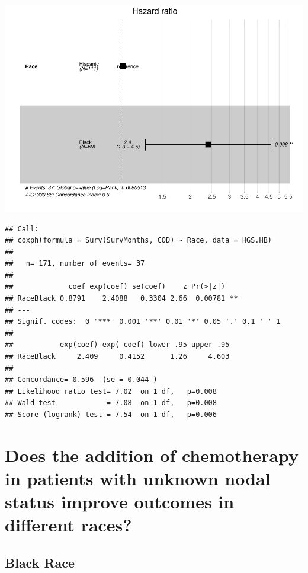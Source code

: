 \documentclass[
]{article}
\begin{document}
\includegraphics{EarlyOvaryRace_files/figure-latex/unnamed-chunk-7-1.pdf}

\begin{verbatim}
## Call:
## coxph(formula = Surv(SurvMonths, COD) ~ Race, data = HGS.HB)
## 
##   n= 171, number of events= 37 
## 
##             coef exp(coef) se(coef)    z Pr(>|z|)   
## RaceBlack 0.8791    2.4088   0.3304 2.66  0.00781 **
## ---
## Signif. codes:  0 '***' 0.001 '**' 0.01 '*' 0.05 '.' 0.1 ' ' 1
## 
##           exp(coef) exp(-coef) lower .95 upper .95
## RaceBlack     2.409     0.4152      1.26     4.603
## 
## Concordance= 0.596  (se = 0.044 )
## Likelihood ratio test= 7.02  on 1 df,   p=0.008
## Wald test            = 7.08  on 1 df,   p=0.008
## Score (logrank) test = 7.54  on 1 df,   p=0.006
\end{verbatim}

\hypertarget{does-the-addition-of-chemotherapy-in-patients-with-unknown-nodal-status-improve-outcomes-in-different-races}{%
\section{Does the addition of chemotherapy in patients with unknown
nodal status improve outcomes in different
races?}\label{does-the-addition-of-chemotherapy-in-patients-with-unknown-nodal-status-improve-outcomes-in-different-races}}

\hypertarget{black-race}{%
\subsection{Black Race}\label{black-race}}
\end{document}

